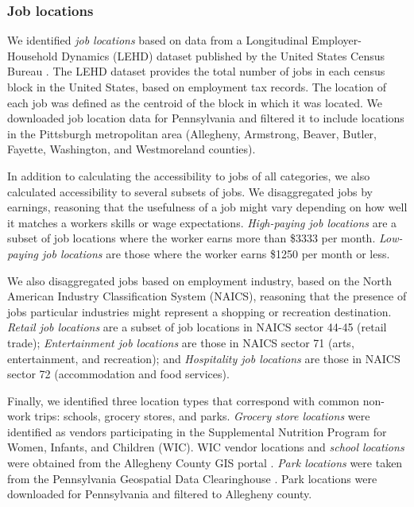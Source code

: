 \documentclass[
]{book}
\begin{document}
\hypertarget{job-locations}{%
\subsubsection{Job locations}\label{job-locations}}

We identified \emph{job locations} based on data from a Longitudinal
Employer-Household Dynamics (LEHD) dataset published by the United States Census
Bureau \citep{united_states_census_bureau_lehd_2021}. The LEHD dataset provides the
total number of jobs in each census block in the United States, based on
employment tax records. The location of each job was defined as the centroid of
the block in which it was located. We downloaded job location data for
Pennsylvania and filtered it to include locations in the Pittsburgh metropolitan
area (Allegheny, Armstrong, Beaver, Butler, Fayette, Washington, and
Westmoreland counties).

In addition to calculating the accessibility to jobs of all categories, we also
calculated accessibility to several subsets of jobs. We disaggregated jobs by
earnings, reasoning that the usefulness of a job might vary depending on how
well it matches a workers skills or wage expectations. \emph{High-paying job locations}
are a subset of job locations where the worker earns more than \$3333 per month.
\emph{Low-paying job locations} are those where the worker earns \$1250 per month or less.

We also disaggregated jobs based on employment industry, based on the North
American Industry Classification System (NAICS), reasoning that the presence of
jobs particular industries might represent a shopping or recreation destination.
\emph{Retail job locations} are a subset of job locations in NAICS sector 44-45
(retail trade); \emph{Entertainment job locations} are those in NAICS sector 71
(arts, entertainment, and recreation); and \emph{Hospitality job locations} are
those in NAICS sector 72 (accommodation and food services).

Finally, we identified three location types that correspond with common non-work
trips: schools, grocery stores, and parks. \emph{Grocery store locations} were
identified as vendors participating in the Supplemental Nutrition Program for
Women, Infants, and Children (WIC). WIC vendor locations and \emph{school locations}
were obtained from the Allegheny County GIS portal
\citep{allegheny_county_office_of_information_technology_allegheny_2018, allegheny_county_office_of_information_technology_allegheny_2020}.
\emph{Park locations} were taken from the Pennsylvania Geospatial Data Clearinghouse
\citep{pennsylvania_department_of_conservation_and_natural_resources_pennsylvania_2015}.
Park locations were downloaded for Pennsylvania and filtered to Allegheny county.
\end{document}
